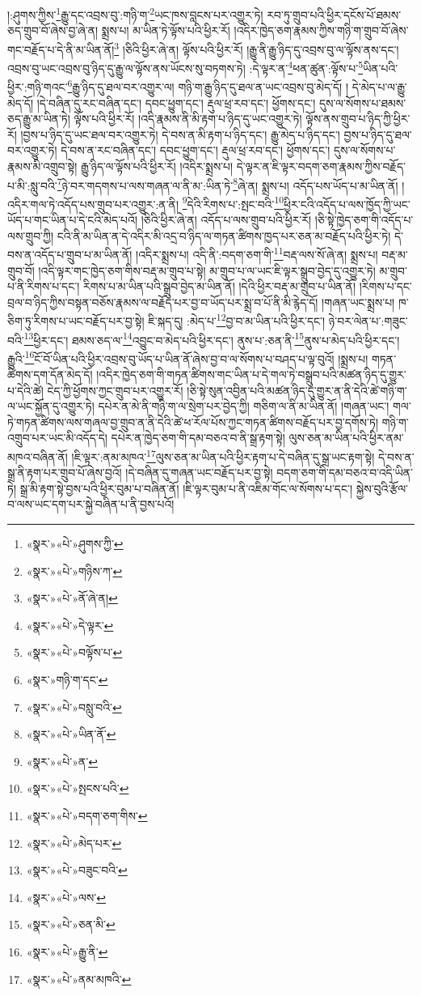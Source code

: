 །:ཤུགས་ཀྱིས་\footnote{«སྣར་»«པེ་»ཤུགས་ཀྱི་}རྒྱུ་དང་འབྲས་བུ་:གཉི་ག་\footnote{«སྣར་»«པེ་»གཉིས་ཀ་}ཡང་ཁས་བླངས་པར་འགྱུར་ཏེ། རབ་ཏུ་གྲུབ་པའི་ཕྱིར་དངོས་པོ་ཐམས་ཅད་གྲུབ་བོ་ཞེས་བྱ་ཞེ་ན། སྨྲས་པ། མ་ཡིན་ཏེ་ལྟོས་པའི་ཕྱིར་རོ། །འདིར་ཁྱེད་ཅག་རྣམས་ཀྱིས་གཉི་ག་གྲུབ་བོ་ཞེས་གང་བརྗོད་པ་དེ་ནི་མ་ཡིན་ནོ།\footnote{«སྣར་»«པེ་»ནོ་ཞེ་ན།} །ཅིའི་ཕྱིར་ཞེ་ན། ལྟོས་པའི་ཕྱིར་རོ། །རྒྱུ་ནི་རྒྱུ་ཉིད་དུ་འབྲས་བུ་ལ་ལྟོས་ནས་དང་། འབྲས་བུ་ཡང་འབྲས་བུ་ཉིད་དུ་རྒྱུ་ལ་ལྟོས་ནས་ཡོངས་སུ་བཏགས་ཏེ། :དེ་ལྟར་ན་\footnote{«སྣར་»«པེ་»དེ་ལྟར་}ཕན་ཚུན་:ལྟོས་པ་\footnote{«སྣར་»«པེ་»བལྟོས་པ་}ཡིན་པའི་ཕྱིར་:གཉི་གའང་\footnote{«སྣར་»གཉི་ག་དང་}རྒྱུ་ཉིད་དུ་ཐལ་བར་འགྱུར་ལ། གཉི་ག་རྒྱུ་ཉིད་དུ་ཐལ་ན་ཡང་འབྲས་བུ་མེད་དོ། །
དེ་མེད་པ་ལ་རྒྱུ་མེད་དོ། །དེ་བཞིན་དུ་རང་བཞིན་དང་། དབང་ཕྱུག་དང་། རྡུལ་ཕྲ་རབ་དང་། ཕྱོགས་དང་། དུས་ལ་སོགས་པ་ཐམས་ཅད་རྒྱུ་མ་ཡིན་ཏེ། ལྟོས་པའི་ཕྱིར་རོ། །འདི་རྣམས་ནི་མི་རྟག་པ་ཉིད་དུ་ཡང་འགྱུར་ཏེ། ལྟོས་ནས་གྲུབ་པ་ཉིད་ཀྱི་ཕྱིར་རོ། །བྱས་པ་ཉིད་དུ་ཡང་ཐལ་བར་འགྱུར་ཏེ། དེ་བས་ན་མི་རྟག་པ་ཉིད་དང་། རྒྱུ་མེད་པ་ཉིད་དང་། བྱས་པ་ཉིད་དུ་ཐལ་བར་འགྱུར་ཏེ། དེ་བས་ན་རང་བཞིན་དང་། དབང་ཕྱུག་དང་། རྡུལ་ཕྲ་རབ་དང་། ཕྱོགས་དང་། དུས་ལ་སོགས་པ་རྣམས་མི་འགྲུབ་སྟེ། རྒྱུ་ཉིད་ལ་ལྟོས་པའི་ཕྱིར་རོ། །འདིར་སྨྲས་པ། དེ་ལྟར་ན་ཇི་ལྟར་བདག་ཅག་རྣམས་ཀྱིས་བརྗོད་པ་མི་:སླུ་བའི་\footnote{«སྣར་»«པེ་»བསླུ་བའི་}ཉེ་བར་གདགས་པ་ལས་གཞན་ལ་ནི་མ་:ཡིན་ཏེ་\footnote{«སྣར་»«པེ་»ཡིན་ནོ་}ཞེ་ན། སྨྲས་པ། འདོད་པས་ཡོད་པ་མ་ཡིན་ནོ། །འདིར་གལ་ཏེ་འདོད་པས་གྲུབ་པར་འགྱུར་:ན་ནི། \footnote{«སྣར་»«པེ་»ན་}དེའི་རིགས་པ་:སྤང་བའི་\footnote{«སྣར་»«པེ་»སྤངས་པའི་}ཕྱིར་ངའི་འདོད་པ་ལས་ཁྱོད་ཀྱི་ཡང་ཡོད་པ་གང་ཡིན་པ་དེ་ངའི་མེད་པའོ། །ཅིའི་ཕྱིར་ཞེ་ན། འདོད་པ་ལས་གྲུབ་པའི་ཕྱིར་རོ། །ཅི་སྟེ་ཁྱེད་ཅག་གི་འདོད་པ་ལས་གྲུབ་ཀྱི། ངའི་ནི་མ་ཡིན་ན་དེ་འདིར་མི་འདྲ་བ་ཉིད་ལ་གཏན་ཚིགས་ཁྱད་པར་ཅན་མ་བརྗོད་པའི་ཕྱིར་ཏེ། དེ་བས་ན་འདོད་པ་གྲུབ་པ་མ་ཡིན་ནོ། །འདིར་སྨྲས་པ། འདི་ནི་:བདག་ཅག་གི་\footnote{«སྣར་»«པེ་»བདག་ཅག་གིས་}བརྡ་ལས་སོ་ཞེ་ན། སྨྲས་པ། བརྡ་མ་གྲུབ་བོ། །འདི་ལྟར་གང་ཁྱེད་ཅག་གིས་བརྡ་མ་གྲུབ་པ་སྟེ། མ་གྲུབ་པ་ལ་ཡང་ཇི་ལྟར་སྒྲུབ་བྱེད་དུ་འགྱུར་ཏེ། མ་གྲུབ་པ་ནི་རིགས་པ་དང་། རིགས་པ་མ་ཡིན་པའི་སྒྲུབ་བྱེད་མ་ཡིན་ནོ། །དེའི་ཕྱིར་བརྡ་མ་གྲུབ་པ་ཡིན་ནོ། །རིགས་པ་དང་བྲལ་བ་ཉིད་ཀྱིས་བསྟན་བཅོས་རྣམས་ལ་བརྗོད་པར་བྱ་བ་ཡོད་པར་སྨྲ་བ་པོ་ནི་མི་རྙེད་དོ། །གཞན་ཡང་སྨྲས་པ། ཁ་ཅིག་ཏུ་རིགས་པ་ཡང་བརྗོད་པར་བྱ་སྟེ། ཇི་སྐད་དུ། :མེད་པ་\footnote{«སྣར་»«པེ་»མེད་པར་}བྱ་བ་མ་ཡིན་པའི་ཕྱིར་དང་། ཉེ་བར་ལེན་པ་:གཟུང་བའི་\footnote{«སྣར་»«པེ་»བཟུང་བའི་}ཕྱིར་དང་། ཐམས་ཅད་ལ་\footnote{«སྣར་»«པེ་»ལས་}འབྱུང་བ་མེད་པའི་ཕྱིར་དང་། ནུས་པ་:ཅན་ནི་\footnote{«སྣར་»«པེ་»ཅན་མི་}ནུས་པ་མེད་པའི་ཕྱིར་དང་། རྒྱུའི་\footnote{«སྣར་»«པེ་»རྒྱུ་ནི་}ངོ་བོ་ཡིན་པའི་ཕྱིར་འབྲས་བུ་ཡོད་པ་ཡིན་ནོ་ཞེས་བྱ་བ་ལ་སོགས་པ་བཤད་པ་ལྟ་བུའོ། །སྨྲས་པ། གཏན་ཚིགས་དག་དོན་མེད་དོ། །འདིར་ཁྱེད་ཅག་གི་གཏན་ཚིགས་གང་ཡིན་པ་དེ་གལ་ཏེ་བསྒྲུབ་པའི་མཚན་ཉིད་དུ་གྱུར་པ་དེའི་ཚེ། ངེད་ཀྱི་ཕྱོགས་ཀྱང་གྲུབ་པར་འགྱུར་རོ། །ཅི་སྟེ་སུན་འབྱིན་པའི་མཚན་ཉིད་དུ་གྱུར་ན་ནི་དེའི་ཚེ་གཉི་ག་ལ་ཡང་སྐྱོན་དུ་འགྱུར་ཏེ། དཔེར་ན་མེ་ནི་གཉི་ག་ལ་སྲེག་པར་བྱེད་ཀྱི། གཅིག་ལ་ནི་མ་ཡིན་ནོ། །གཞན་ཡང་། གལ་ཏེ་གཏན་ཚིགས་ལས་གཞལ་བྱ་གྲུབ་ན་ནི་དེའི་ཚེ་ཕ་རོལ་པོས་ཀྱང་གཏན་ཚིགས་བརྗོད་པར་བྱ་དགོས་ཏེ། གཉི་ག་འགྲུབ་པར་ཡང་མི་འདོད་དེ། དཔེར་ན་ཁྱེད་ཅག་གི་དམ་བཅའ་བ་ནི་སྒྲ་རྟག་སྟེ། ལུས་ཅན་མ་ཡིན་པའི་ཕྱིར་ནམ་མཁའ་བཞིན་ནོ། །ཇི་ལྟར་:ནམ་མཁའ་\footnote{«སྣར་»«པེ་»ནམ་མཁའི་}ལུས་ཅན་མ་ཡིན་པའི་ཕྱིར་རྟག་པ་དེ་བཞིན་དུ་སྒྲ་ཡང་རྟག་སྟེ། དེ་བས་ན་སྒྲ་ནི་རྟག་པར་གྲུབ་པོ་ཞེས་བྱའོ། །དེ་བཞིན་དུ་གཞན་ཡང་བརྗོད་པར་བྱ་སྟེ། བདག་ཅག་གི་དམ་བཅའ་བ་འདི་ཡིན་ཏེ། སྒྲ་མི་རྟག་སྟེ་བྱས་པའི་ཕྱིར་བུམ་པ་བཞིན་ནོ། །ཇི་ལྟར་བུམ་པ་ནི་འཇིམ་གོང་ལ་སོགས་པ་དང་། སྐྱེས་བུའི་རྩོལ་བ་ལས་ཡང་དག་པར་སྐྱེ་བཞིན་པ་ནི་བྱས་པའོ། 